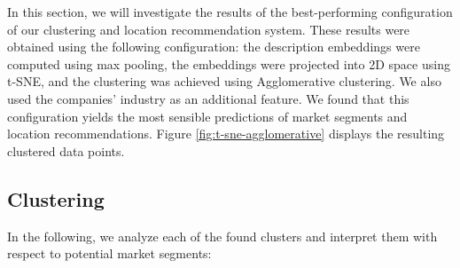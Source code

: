 \documentclass[conference]{IEEEtran}
\begin{document}
In this section, we will investigate the results of the best-performing configuration of our clustering and location recommendation system. These results were obtained using the following configuration: the description embeddings were computed using max pooling, the embeddings were projected into 2D space using t-SNE, and the clustering was achieved using Agglomerative clustering. We also used the companies' industry as an additional feature.
 We found that this configuration yields the most sensible predictions of market segments and location recommendations. Figure \ref{fig:t-sne-agglomerative} displays the resulting clustered data points.

\subsection{Clustering}
\label{sec:clustering-results}
In the following, we analyze each of the found clusters and interpret them with respect to potential market segments:
\end{document}
